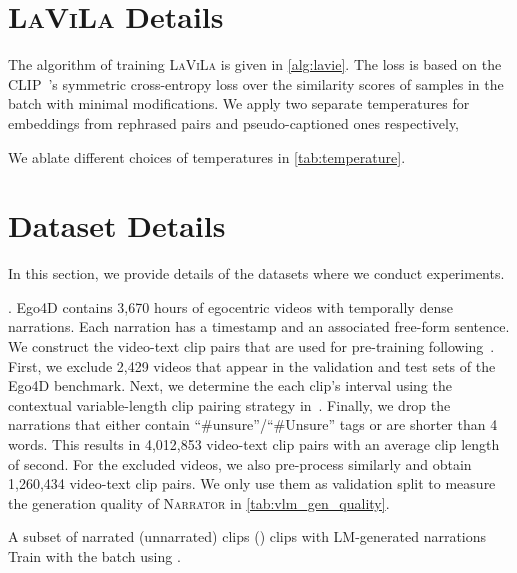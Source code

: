 \documentclass[10pt,twocolumn,letterpaper]{article}
\newcommand{\myparagraph}[1]{\vspace{0pt}\noindent{\bf #1}}
\newcommand{\ours}{\textsc{LaViLa}\xspace}
\newcommand{\narrator}{\textsc{Narrator}\xspace}
\newcommand{\rephraser}{\textsc{Rephraser}\xspace}
\begin{document}
\section{ \bf \ours Details}
\label{sec:appdx:method}

The algorithm of training \ours is given in \cref{alg:lavie}.
The loss is based on the CLIP~\cite{radford2021clip}'s symmetric cross-entropy loss over the similarity scores of samples in the batch  with minimal modifications.
We apply two separate temperatures  for embeddings from rephrased pairs and pseudo-captioned ones respectively,
{\small
	
}
We ablate different choices of temperatures in \cref{tab:temperature}.


\section{Dataset Details}\label{sec:appdx:dataset}

In this section, we provide details of the datasets where we conduct experiments.

\myparagraph{Ego4D}.
Ego4D contains 3,670 hours of egocentric videos with temporally dense narrations.
Each narration has a timestamp and an associated free-form sentence.
We construct the video-text clip pairs that are used for pre-training following~\cite{lin2022egovlp}.
First, we exclude 2,429 videos that appear in the validation and test sets of the Ego4D benchmark.
Next, we determine the each clip's interval using the contextual variable-length clip pairing strategy in~\cite{lin2022egovlp}.
Finally, we drop the narrations that either contain ``\#unsure''/``\#Unsure'' tags or are shorter than 4 words.
This results in 4,012,853 video-text clip pairs with an average clip length of  second.
For the excluded videos, we also pre-process similarly and obtain 1,260,434 video-text clip pairs.
We only use them as validation split to measure the generation quality of \narrator in \cref{tab:vlm_gen_quality}.


\begin{algorithm}[t]
	\caption{One step of training \ours}
	\label{alg:lavie}
	\begin{algorithmic}
		\Require A subset of narrated (unnarrated) clips  ()
		\State clips with LM-generated narrations 
		\For{}
		\State  {}
		\If{} \Comment{Query \rephraser}
		\State 
		\Else  \Comment{Query \narrator}
		\State 
		\EndIf
		\State 
		\EndFor
		\For{}
		\State 
		\State 
		\EndFor
		\State Train  with the batch  using .
	\end{algorithmic}
\end{algorithm}
\end{document}
